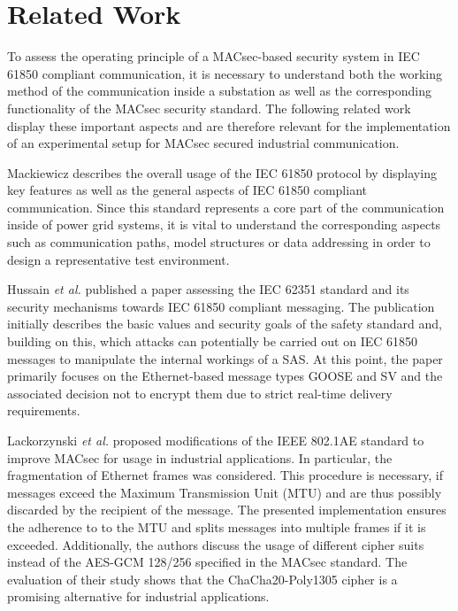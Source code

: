 \documentclass[conference, onecolumn, a4paper]{IEEEtran}
\begin{document}
\section{Related Work}
\label{chapter:relatedWork}
\noindent To assess the operating principle of a MACsec-based security system in IEC 61850 compliant communication, it is necessary to understand both 
the working method of the communication inside a substation as well as the corresponding functionality of the MACsec security standard. The following 
related work display these important aspects and are therefore relevant for the implementation of an experimental setup for MACsec secured industrial 
communication.

\smallskip
Mackiewicz \cite{IEC61850_Overview:2006} describes the overall usage of the IEC 61850 protocol by displaying key features as well as the general aspects 
of IEC 61850 compliant communication. Since this standard represents a core part of the communication inside of power grid systems, it is vital to 
understand the corresponding aspects such as communication paths, model structures or data addressing in order to design a representative test environment. 

\smallskip
Hussain  \textit{et al.} \cite{Review_IEC62351:2019} published a paper assessing the IEC 62351 standard and its security mechanisms towards IEC 61850 
compliant messaging. The publication initially describes the basic values and security goals of the safety standard and, building on this, which attacks 
can potentially be carried out on IEC 61850 messages to manipulate the internal workings of a SAS. At this point, the paper primarily focuses on the 
Ethernet-based message types GOOSE and SV and the associated decision not to encrypt them due to strict real-time delivery requirements.  

\smallskip
Lackorzynski \textit{et al.} \cite{MACsecIndustrialOptimization:2020} proposed modifications of the IEEE 802.1AE standard to improve MACsec for usage 
in industrial applications. In particular, the fragmentation of Ethernet frames was considered. This procedure is necessary, if messages exceed the 
Maximum Transmission Unit (MTU) and are thus possibly discarded by the recipient of the message. The presented implementation ensures the adherence to 
to the MTU and splits messages into multiple frames if it is exceeded. Additionally, the authors discuss the usage of different cipher suits instead of 
the AES-GCM 128/256 specified in the MACsec standard. The evaluation of their study shows that the ChaCha20-Poly1305 cipher is a promising alternative 
for industrial applications.
\end{document}
